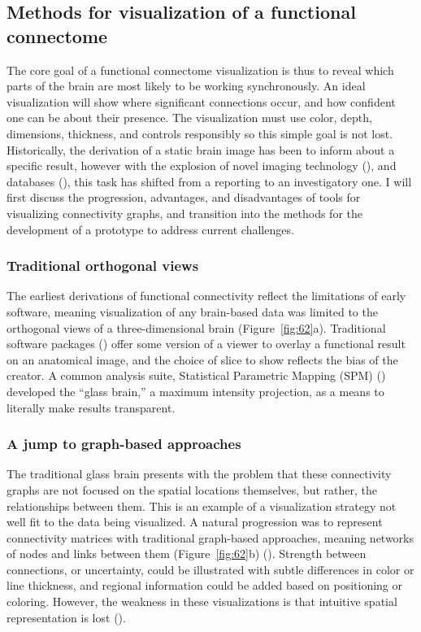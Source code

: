 \documentclass{report}
\begin{document}
\subsection{Methods for visualization of a functional connectome}
The core goal of a functional connectome visualization is thus to reveal which parts of the brain are most likely to be working synchronously.  An ideal visualization will show where significant connections occur, and how confident one can be about their presence.  The visualization must use color, depth, dimensions, thickness, and controls responsibly so this simple goal is not lost.  Historically, the derivation of a static brain image has been to inform about a specific result, however with the explosion of novel imaging technology (\cite{Gonzalez-Castillo2014-aq,Chung2013-xk}), and databases (\cite{Gorgolewski2015-gu,Yarkoni2011-rg,Laird2005-gm,Van_Essen2013-fi,Hall2012-qo}), this task has shifted from a reporting to an investigatory one. I will first discuss the progression, advantages, and disadvantages of tools for visualizing connectivity graphs, and transition into the methods for the development of a prototype to address current challenges.

\subsubsection{Traditional orthogonal views}
The earliest derivations of functional connectivity reflect the limitations of early software, meaning visualization of any brain-based data was limited to the orthogonal views of a three-dimensional brain (Figure~\ref{fig:62}a).  Traditional software packages (\cite{Smith2004-lw,Cox1996-rd}) offer some version of a viewer to overlay a functional result on an anatomical image, and the choice of slice to show reflects the bias of the creator.  A common analysis suite, Statistical Parametric Mapping (SPM) (\cite{Ashburner1994-vc}) developed the ``glass brain,'' a maximum intensity projection, as a means to literally make results transparent.  

\subsubsection{A jump to graph-based approaches}
The traditional glass brain presents with the problem that these connectivity graphs are not focused on the spatial locations themselves, but rather, the relationships between them.  This is an example of a visualization strategy not well fit to the data being visualized.  A natural progression was to represent connectivity matrices with traditional graph-based approaches, meaning networks of nodes and links between them (Figure~\ref{fig:62}b) (\cite{Achard2006-kg}).  Strength between connections, or uncertainty, could be illustrated with subtle differences in color or line thickness, and regional information could be added based on positioning or coloring.  However, the weakness in these visualizations is that intuitive spatial representation is lost (\cite{Salvador2005-pm,Salvador2005-pc}).
\end{document}
